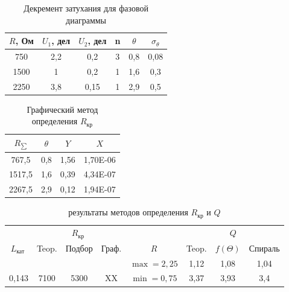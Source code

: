 \documentclass[a4paper, 12pt]{article}%
\begin{document}
\begin{table}[h!]
\begin{center}
\begin{tabular}{|c|c|c|c|c|c|}
\hline
$R$, Ом & $U_1$, дел & $U_2$, дел & n & $\theta$ & $\sigma_{\theta}$ \\ \hline
750  & 2,2  & 0,2        & 3 & 0,8    & 0,08              \\ \hline
1500 & 1    & 0,2        & 1 & 1,6    & 0,3              \\ \hline
2250 & 3,8    & 0,15     & 1 & 2,9    & 0,5              \\ \hline
\end{tabular}
\caption{Декремент затухания для фазовой диаграммы}
\end{center}
\end{table}

\begin{table}[h!]
\begin{center}
\begin{tabular}{|c|c|c|c|}
\hline
\textbf{$R_{\sum}$} & \textbf{$\theta$} & \textbf{$Y$} & \textbf{$X$} \\ \hline
767,5                 & 0,8      & 1,56     & 1,70E-06 \\ \hline
1517,5                & 1,6      & 0,39     & 4,34E-07 \\ \hline
2267,5                & 2,9      & 0,12     & 1,94E-07 \\ \hline
\end{tabular}
\caption{Графический метод определения $R_{\text{кр}}$}
\end{center}
\end{table}


\begin{table}[h!]
\begin{tabular}{|c||c|c|c||c|c|c|c|}
\hline \multicolumn{1}{|l||}{} & \multicolumn{3}{c||}{$R_{\text {кр }}$}  &  & \multicolumn{3}{|c|}{$Q$} \\
\cline { 2 - 4 } \cline { 6 - 8 }$L_{\text {кат }}$ & Teop. & Подбор & Граф. & $R$ & Teop. & $f(\Theta)$ & Спираль \\
\hline \hline & & & & $\max = 2,25$  & 1,12 & 1,08 & 1,04\\
0,143 & 7100 & 5300 & XX & $\min = 0,75$ & 3,37 & 3,93 & 3,4\\
\hline
\end{tabular}
\caption{результаты методов определения $R_{\text{кр}}$ и $Q$}
\end{table}
\end{document}

